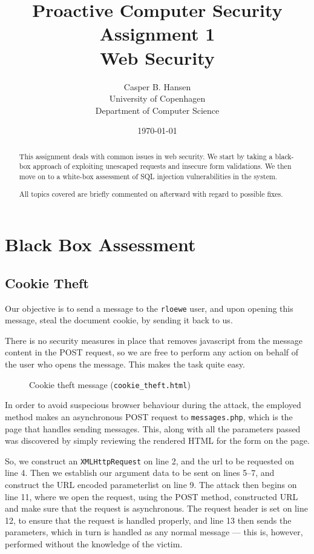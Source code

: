 \documentclass[11pt,a4paper]{article}
\title
{
    {\Large Proactive Computer Security} \\
    Assignment 1 \\
    {\large Web Security}
}
\author
{
    Casper B. Hansen \\
    University of Copenhagen \\
    Department of Computer Science
}
\date{\today}
\newcommand{\file}[1]{{\tt #1}}
\begin{document}
\maketitle
\begin{multicols}{2}
    \begin{abstract}
        This assignment deals with common issues in web security. We start by
        taking a black-box approach of exploiting unescaped requests and
        insecure form validations. We then move on to a white-box assessment
        of SQL injection vulnerabilities in the system.
        
        All topics covered are briefly commented on afterward with regard to
        possible fixes.
    \end{abstract}
    \columnbreak
    \tableofcontents
\end{multicols}
\thispagestyle{empty}
\clearpage

\section{Black Box Assessment}

\subsection{Cookie Theft}
Our objective is to send a message to the {\tt rloewe} user, and upon opening
this message, steal the document cookie, by sending it back to us.

There is no security measures in place that removes javascript from the
message content in the POST request, so we are free to perform any action on
behalf of the user who opens the message. This makes the task quite easy.

\begin{figure}[H]
    
    \caption{Cookie theft message (\file{cookie\_theft.html})}
\end{figure}

In order to avoid suspecious browser behaviour during the attack, the employed
method makes an asynchronous POST request to {\tt messages.php}, which is the
page that handles sending messages. This, along with all the parameters passed
was discovered by simply reviewing the rendered HTML for the form on the page.

So, we construct an {\tt XMLHttpRequest} on line 2, and the url to be requested
on line 4. Then we establish our argument data to be sent on lines 5--7, and
construct the URL encoded parameterlist on line 9. The attack then begins on
line 11, where we open the request, using the POST method, constructed URL and
make sure that the request is asynchronous. The request header is set on line
12, to ensure that the request is handled properly, and line 13 then sends the
parameters, which in turn is handled as any normal message --- this is,
however, performed without the knowledge of the victim.
\end{document}
